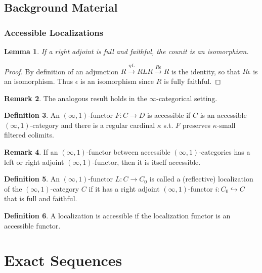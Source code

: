 \documentclass[letterpaper]{article}
\newtheorem{lemma}{Lemma}
\theoremstyle{definition}
\newtheorem{definition}[lemma]{Definition}
\newtheorem{remark}[lemma]{Remark}
\begin{document}
\subsection{Background Material}
\subsubsection{Accessible Localizations}
\begin{lemma}
If a right adjoint is full and faithful, the counit is an isomorphism.
\end{lemma}

\begin{proof}
By definition of an adjunction $R \xrightarrow{\eta L} RLR
\xrightarrow{R\epsilon} R$ is the identity, so that $R\epsilon$ is an
isomorphism. Thus $\epsilon$ is an isomorphism since $R$ is fully
faithful. 
\end{proof}

\begin{remark}
The analogous result holds in the $\infty$-categorical setting.
\end{remark}

\begin{definition}
An $(\infty,1)$-functor $F : C \rightarrow D$ is accessible if $C$ is
an accessible $(\infty,1)$-category and there is a regular cardinal
$\kappa$ s.t. $F$ preserves $\kappa$-small filtered colimits.
\end{definition}

\begin{remark}
If an $(\infty,1)$-functor between accessible $(\infty,1)$-categories
has a left or right adjoint $(\infty,1)$-functor, then it is itself
accessible. 
\end{remark}

\begin{definition}
An $(\infty,1)$-functor $L: C \rightarrow C_0$ is called a
(reflective) localization of the $(\infty,1)$-category $C$ if it has a
right adjoint $(\infty,1)$-functor $i : C_0 \hookrightarrow C$ that is
full and faithful.
\end{definition}

\begin{definition}
A localization is accessible if the localization functor is an
accessible functor. 
\end{definition}



\section{Exact Sequences}
\end{document}
